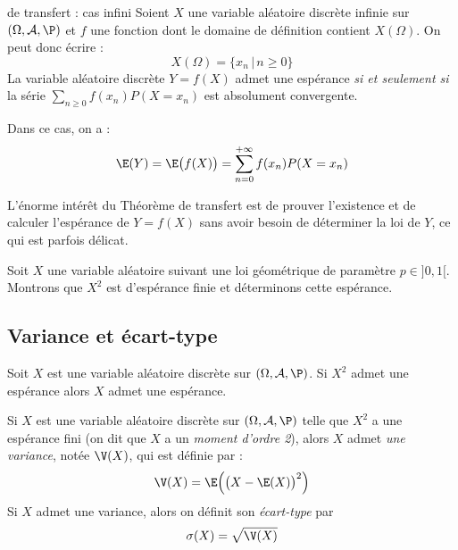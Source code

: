 \documentclass[french,11pt,twoside]{VcCours}
\begin{document}
\begin{Theoreme}{de transfert : cas infini}
Soient $X$ une variable aléatoire discrète infinie sur $(\Omega, \mathcal{A}, \P)$ et $f$ une fonction dont le domaine de définition contient $X(\Omega)$. On peut donc écrire :
$$ X(\Omega) = \lbrace x_n \, \vert \, n \geq 0 \rbrace$$
La variable aléatoire discrète $Y=f(X)$ admet une espérance \emph{si et seulement si} la série \linebreak $\sum_{n \geq 0} f(x_n) P(X=x_n)$ est absolument convergente. 

Dans ce cas, on a :
\[\E(Y)=\E\big(f(X)\big)= \sum_{n = 0}^{+ \infty} f(x_n) P(X=x_n)\]
\end{Theoreme}

\begin{Remarque}{}
L'énorme intérêt du Théorème de transfert est de prouver l'existence et de calculer l'espérance de $Y=f(X)$ sans avoir besoin de déterminer la loi de $Y$, ce qui est parfois délicat.
\end{Remarque}

\begin{Exemple}{} Soit $X$ une variable aléatoire suivant une loi géométrique de paramètre $p \in ]0,1[$. Montrons que $X^2$ est d'espérance finie et déterminons cette espérance.

\vspace{10cm}
\end{Exemple}


\subsection{Variance et écart-type}
\begin{Proposition}{} Soit $X$ est une variable aléatoire discrète sur $(\Omega, \mathcal{A}, \P)$. Si $X^2$ admet une espérance alors $X$ admet une espérance.
\end{Proposition}

\begin{Demonstration}{}

\vspace{6cm}
\end{Demonstration}

\begin{TheoremeDefinition}{}
Si $X$ est une variable aléatoire discrète sur $(\Omega, \mathcal{A}, \P)$  telle que $X^2$ a une espérance fini (on dit que $X$ a un \emph{moment d'ordre 2}), alors $X$ admet \emph{une variance}, notée $\V(X)$, qui est définie par :
$$\V(X) = \E\Big(\big(X-\E(X)\big)^2\Big)$$
Si $X$ admet une variance, alors on définit son \emph{écart-type} par 
$$\sigma (X) = \sqrt{\V(X)}$$
\end{TheoremeDefinition}{}
\end{document}
